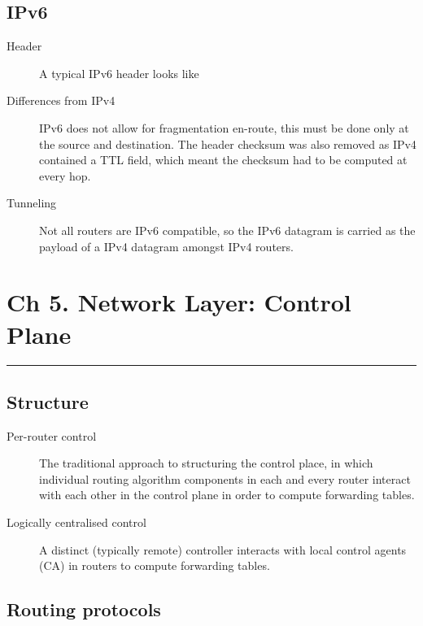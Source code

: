 \documentclass{article}
\begin{document}
\subsection*{IPv6}

\begin{description}
    \item[Header] A typical IPv6 header looks like
    
    \item[Differences from IPv4] IPv6 does not allow for fragmentation en-route, this must be done
    only at the source and destination. The header checksum was also removed as IPv4 contained a TTL
    field, which meant the checksum had to be computed at every hop. 
    
    \item[Tunneling] Not all routers are IPv6 compatible, so the IPv6 datagram is carried as the
    payload of a IPv4 datagram amongst IPv4 routers. 
\end{description}

\newpage

\section*{Ch 5. Network Layer: Control Plane}
\noindent
\rule{\linewidth}{0.5mm}
\noindent

\subsection*{Structure}

\begin{description}
    \item[Per-router control] The traditional approach to structuring the control place, in which 
    individual routing algorithm components in each and every router interact with each other in the
    control plane in order to compute forwarding tables.
    
    \item[Logically centralised control] A distinct (typically remote) controller interacts with local
    control agents (CA) in routers to compute forwarding tables. 
\end{description}

\subsection*{Routing protocols}
\end{document}
